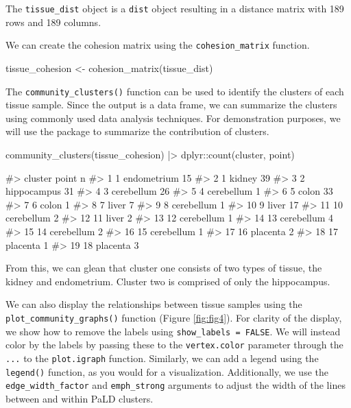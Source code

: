 The \texttt{tissue\_dist} object is a \texttt{dist} object resulting in
a distance matrix with 189 rows and 189 columns.

We can create the cohesion matrix using the \texttt{cohesion\_matrix}
function.

\begin{Schunk}
\begin{Sinput}
tissue_cohesion <- cohesion_matrix(tissue_dist)
\end{Sinput}
\end{Schunk}

The \texttt{community\_clusters()} function can be used to identify the
clusters of each tissue sample. Since the output is a data frame, we can
summarize the clusters using commonly used data analysis techniques. For
demonstration purposes, we will use the  package to
summarize the contribution of clusters.

\begin{Schunk}
\begin{Sinput}
community_clusters(tissue_cohesion) |>
  dplyr::count(cluster, point)
\end{Sinput}
\begin{Soutput}
#>    cluster       point  n
#> 1        1 endometrium 15
#> 2        1      kidney 39
#> 3        2 hippocampus 31
#> 4        3  cerebellum 26
#> 5        4  cerebellum  1
#> 6        5       colon 33
#> 7        6       colon  1
#> 8        7       liver  7
#> 9        8  cerebellum  1
#> 10       9       liver 17
#> 11      10  cerebellum  2
#> 12      11       liver  2
#> 13      12  cerebellum  1
#> 14      13  cerebellum  4
#> 15      14  cerebellum  2
#> 16      15  cerebellum  1
#> 17      16    placenta  2
#> 18      17    placenta  1
#> 19      18    placenta  3
\end{Soutput}
\end{Schunk}

From this, we can glean that cluster one consists of two types of
tissue, the kidney and endometrium. Cluster two is comprised of only the
hippocampus.

We can also display the relationships between tissue samples using the
\texttt{plot\_community\_graphs()} function (Figure \ref{fig:fig4}). For
clarity of the display, we show how to remove the labels using
\texttt{show\_labels\ =\ FALSE}. We will instead color by the labels by
passing these to the \texttt{vertex.color} parameter through the
\texttt{...} to the \texttt{plot.igraph} function. Similarly, we can add
a legend using the \texttt{legend()} function, as you would for a
 visualization. Additionally, we use the
\texttt{edge\_width\_factor} and \texttt{emph\_strong} arguments to
adjust the width of the lines between and within PaLD clusters.

